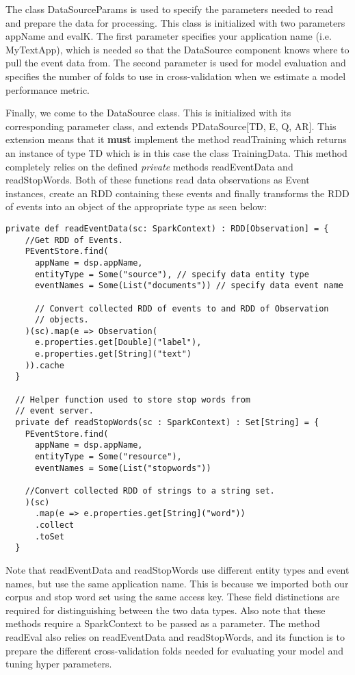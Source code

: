 \documentclass[a4paper,12pt]{article}
\renewcommand{\bf}[1]{\textbf{#1}}
\renewcommand{\it}[1]{\textit{#1}}
\newcommand{\3}{\left}
\newcommand{\4}{\right}
\renewcommand{\-}[1]{{}^{-#1}}
\begin{document}
The class DataSourceParams is used to specify the parameters needed to read and prepare the data for processing. This class is initialized with two parameters appName and evalK. The first parameter specifies your application name (i.e. MyTextApp), which is needed so that the DataSource component knows where to pull the event data from. The second parameter is used for model evaluation and specifies the number of folds to use in cross-validation 
when we estimate a model performance metric.

\break

Finally, we come to the DataSource class. This is initialized with its corresponding parameter class, and extends PDataSource[TD, E, Q, AR]. This extension means that it \bf{must} implement the method readTraining which returns an instance of type TD which is in this case the class TrainingData. This method completely relies on the defined \it{private} methods readEventData and readStopWords. Both of these functions read data observations as Event instances, create an RDD containing these events and finally transforms the RDD of events into an object of the appropriate type as seen below:

\begin{verbatim}
private def readEventData(sc: SparkContext) : RDD[Observation] = {
    //Get RDD of Events.
    PEventStore.find(
      appName = dsp.appName,
      entityType = Some("source"), // specify data entity type
      eventNames = Some(List("documents")) // specify data event name

      // Convert collected RDD of events to and RDD of Observation
      // objects.
    )(sc).map(e => Observation(
      e.properties.get[Double]("label"),
      e.properties.get[String]("text")
    )).cache
  }

  // Helper function used to store stop words from
  // event server.
  private def readStopWords(sc : SparkContext) : Set[String] = {
    PEventStore.find(
      appName = dsp.appName,
      entityType = Some("resource"),
      eventNames = Some(List("stopwords"))

    //Convert collected RDD of strings to a string set.
    )(sc)
      .map(e => e.properties.get[String]("word"))
      .collect
      .toSet
  }
\end{verbatim}

Note that readEventData and readStopWords use different entity types and event names, but use the same application name. This is because we imported both our corpus and stop word set using the same access key. These field distinctions are required for distinguishing between the two data types. Also note that these methods require a SparkContext to be passed as a parameter. The method readEval also relies on readEventData and readStopWords, and its function is to prepare the different cross-validation folds needed for evaluating your model and tuning hyper parameters. 
\end{document}
